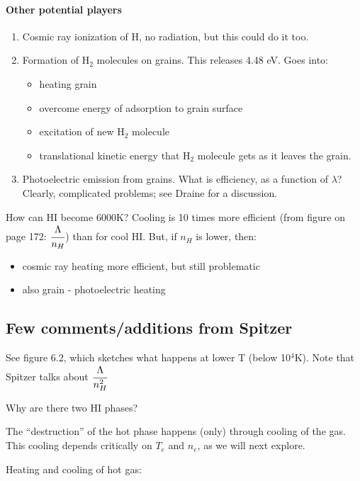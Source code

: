 \documentclass[12pt]{article}
\newcommand{\mar}[1]{\hspace{0pt}\marginpar{-\textcolor{black}{#1}-}}
\newcommand{\mynotes}[1]{\textcolor{mygreen}{#1}}
\begin{document}
\paragraph{Other potential players}
\begin{enumerate}[label=(\alph*)]
    \item Cosmic ray ionization of H, \mynotes{no radiation, but this
        could do it too}.
    \item Formation of H$_{2}$ molecules on grains.
        This releases 4.48 eV. Goes into:
        \begin{itemize}
            \item heating grain
            \item overcome energy of adsorption to grain surface
            \item excitation of new H$_{2}$ molecule
            \item translational kinetic energy that H$_{2}$ molecule
                gets as it leaves the grain.
        \end{itemize}
    \item Photoelectric emission from grains. What is efficiency, as a
        function of $\lambda$? Clearly, complicated problems; see
        Draine for a discussion.
\end{enumerate}
How can HI become 6000K? Cooling is 10 times more efficient
(from figure on page 172: $\cfrac{\Lambda}{n_{H}}$) than for cool HI.
But, if $n_{H}$ is lower, then:
\begin{itemize}
    \item cosmic ray heating more efficient, but still problematic
    \item also grain - photoelectric heating
\end{itemize}

\subsection{Few comments/additions from Spitzer}
See figure 6.2, which sketches what happens at lower T (below 10$^{4}$K).
Note that Spitzer talks about $\cfrac{\Lambda}{n_{H}^{2}}$

\mar{166}Why are there two HI phases?

\mar{167}The ``destruction'' of the hot phase happens (only) through
cooling of the gas. This cooling depends critically on $T_{e}$ and
$n_{e}$, as we will next explore.

\mar{168}Heating and cooling of hot gas:
\end{document}
